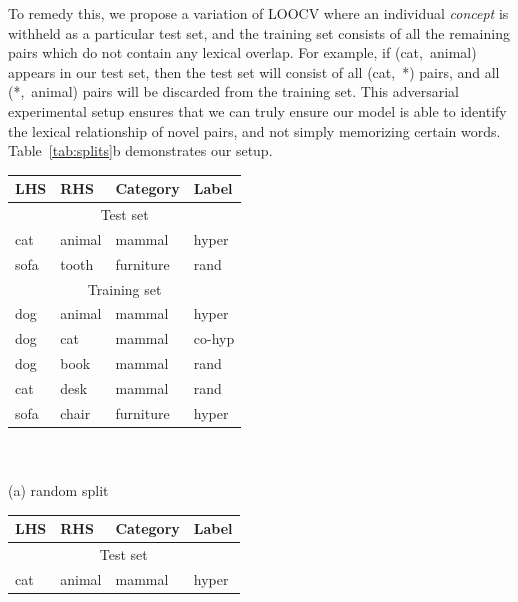To remedy this, we propose a variation of LOOCV where an individual {\em
concept} is withheld as a particular test set, and the training set consists of
all the remaining pairs which do not contain any lexical overlap. For example,
if \mbox{(cat,~animal)} appears in our test set, then the test set will consist
of all \mbox{(cat,~*)} pairs, and all \mbox{(*,~animal)} pairs will be
discarded from the training set. This adversarial experimental setup ensures
that we can truly ensure our model is able to identify the lexical relationship
of novel pairs, and not simply memorizing certain words.
Table~\ref{tab:splits}b demonstrates our setup.

\begin{table}
  \begin{minipage}[b]{6cm}
  \centering
  \begin{tabular}{|llll|}
    \hline
    {\bf LHS} & {\bf RHS} & {\bf Category} & {\bf Label} \\
    \hline
    \hline
    \multicolumn{4}{|c|}{Test set}\\
    \hline
    cat       &  animal   &  mammal        & hyper       \\
    sofa      &  tooth    &  furniture     & rand        \\
    \hline
    \hline
    \multicolumn{4}{|c|}{Training set}\\
    \hline
    dog       &  animal   &  mammal        & hyper       \\
    dog       &  cat      &  mammal        & co-hyp      \\
    dog       &  book     &  mammal        & rand        \\
    cat       &  desk     &  mammal        & rand        \\
    sofa      &  chair    &  furniture     & hyper       \\
    \hline
  \end{tabular}\\~\\{\small (a) random split}
  \end{minipage}
  \qquad\quad
  \begin{minipage}[b]{6cm}
    \centering
  \begin{tabular}{|llll|}
    \hline
    {\bf LHS} & {\bf RHS} & {\bf Category} & {\bf Label} \\
    \hline
    \hline
    \multicolumn{4}{|c|}{Test set}\\
    \hline
    cat       &  animal   &  mammal        & hyper       \\

\end{tabular}
\end{minipage}
\end{table}
